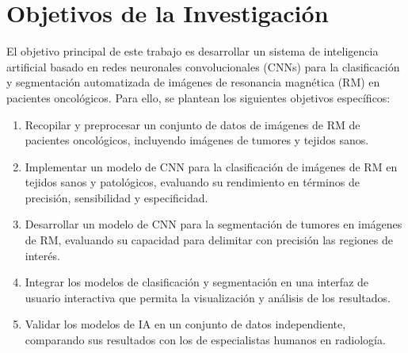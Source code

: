 \section{Objetivos de la Investigación} \label{sec:objetivos}
El objetivo principal de este trabajo es desarrollar un sistema de inteligencia artificial basado en redes neuronales convolucionales (CNNs) para la clasificación y segmentación automatizada de imágenes de resonancia magnética (RM) en pacientes oncológicos. Para ello, se plantean los siguientes objetivos específicos:
\begin{enumerate}
    \item Recopilar y preprocesar un conjunto de datos de imágenes de RM de pacientes oncológicos, incluyendo imágenes de tumores y tejidos sanos.
    \item Implementar un modelo de CNN para la clasificación de imágenes de RM en tejidos sanos y patológicos, evaluando su rendimiento en términos de precisión, sensibilidad y especificidad.
    \item Desarrollar un modelo de CNN para la segmentación de tumores en imágenes de RM, evaluando su capacidad para delimitar con precisión las regiones de interés.
    \item Integrar los modelos de clasificación y segmentación en una interfaz de usuario interactiva que permita la visualización y análisis de los resultados.
    \item Validar los modelos de IA en un conjunto de datos independiente, comparando sus resultados con los de especialistas humanos en radiología.
\end{enumerate}

